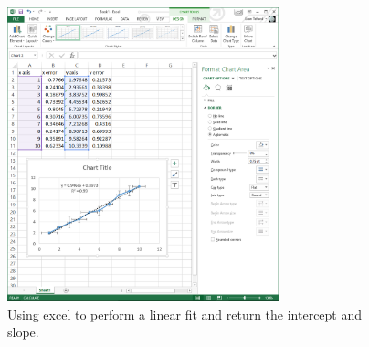 \begin{figure}[h!]
\centering
\includegraphics[height=0.4\textheight, width = 0.7\textwidth]{./Exp1/pic/image6.png}
\caption{Using excel to perform a linear fit and return the intercept and slope.}
\label{fig:excel3}
\end{figure}
\newpage
